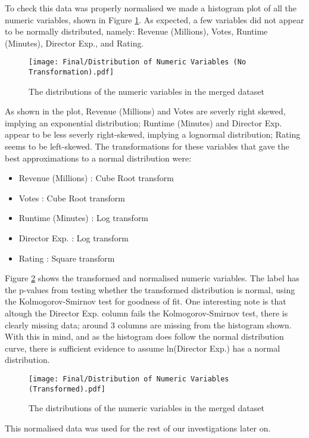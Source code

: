         To check this data was properly normalised we made a histogram plot of all the numeric variables, shown in Figure \ref*{fig-distribution-of-numeric-variable}.
        As expected, a few variables did not appear to be normally distributed, namely: Revenue (Millions), Votes, Runtime (Minutes), 
            Director Exp., and Rating.
        \begin{figure}[h]
            \centering
            \texttt{[image: Final/Distribution of Numeric Variables (No Transformation).pdf]}
            \caption[short]{The distributions of the numeric variables in the merged dataset}\label{fig-distribution-of-numeric-variable}
        \end{figure}
        As shown in the plot, Revenue (Millions) and Votes are severly right skewed, implying an exponential distribution;
        Runtime (Minutes) and Director Exp. appear to be less severly right-skewed, implying a lognormal distribution;
        Rating seems to be left-skewed.
        The transformations for these variables that gave the best approximations to a normal distribution were:
        \begin{multicols}{2}
            \begin{itemize}
                \item Revenue (Millions) : Cube Root transform
                \item Votes              : Cube Root transform
                \item Runtime (Minutes)  : Log transform
                \item Director Exp.      : Log transform
                \item Rating             : Square transform
            \end{itemize}
        \end{multicols}
        Figure \ref*{fig-transformed-distribution-of-numeric-variable} shows the transformed and normalised numeric variables.
        The label has the p-values from testing whether the transformed distribution is normal, using the Kolmogorov-Smirnov
            test for goodness of fit.
        One interesting note is that altough the Director Exp. column fails the Kolmogorov-Smirnov test, there is clearly missing
            data; around 3 columns are missing from the histogram shown.
        With this in mind, and as the histogram does follow the normal distribution curve, there is sufficient evidence to assume
            ln(Director Exp.) has a normal distribution.
        \begin{figure}[h]
            \centering
            \texttt{[image: Final/Distribution of Numeric Variables (Transformed).pdf]}
            \caption[short]{The distributions of the numeric variables in the merged dataset}\label{fig-transformed-distribution-of-numeric-variable}
        \end{figure}
        This normalised data was used for the rest of our investigations later on.
